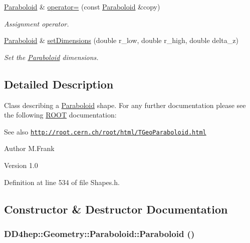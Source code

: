 \begin{DoxyCompactItemize}
\hyperlink{class_d_d4hep_1_1_geometry_1_1_paraboloid}{Paraboloid} \& \hyperlink{class_d_d4hep_1_1_geometry_1_1_paraboloid_ad6b240ee1db323b5a8f69c292632d011}{operator=} (const \hyperlink{class_d_d4hep_1_1_geometry_1_1_paraboloid}{Paraboloid} \&copy)
\begin{DoxyCompactList}\small\item\em Assignment operator. \item\end{DoxyCompactList}\item 
\hyperlink{class_d_d4hep_1_1_geometry_1_1_paraboloid}{Paraboloid} \& \hyperlink{class_d_d4hep_1_1_geometry_1_1_paraboloid_ac05a503afc384dfc0fc882465e9e43df}{setDimensions} (double r\_\-low, double r\_\-high, double delta\_\-z)
\begin{DoxyCompactList}\small\item\em Set the \hyperlink{class_d_d4hep_1_1_geometry_1_1_paraboloid}{Paraboloid} dimensions. \item\end{DoxyCompactList}\end{DoxyCompactItemize}


\subsection{Detailed Description}
Class describing a \hyperlink{class_d_d4hep_1_1_geometry_1_1_paraboloid}{Paraboloid} shape. For any further documentation please see the following \hyperlink{namespace_r_o_o_t}{ROOT} documentation: \begin{DoxySeeAlso}{See also}
\href{http://root.cern.ch/root/html/TGeoParaboloid.html}{\tt http://root.cern.ch/root/html/TGeoParaboloid.html}
\end{DoxySeeAlso}
\begin{DoxyAuthor}{Author}
M.Frank 
\end{DoxyAuthor}
\begin{DoxyVersion}{Version}
1.0 
\end{DoxyVersion}


Definition at line 534 of file Shapes.h.

\subsection{Constructor \& Destructor Documentation}
\hypertarget{class_d_d4hep_1_1_geometry_1_1_paraboloid_a8be57432e8083414ec8e3fbe1ba5fcbf}{
\subsubsection[{Paraboloid}]{\setlength{\rightskip}{0pt plus 5cm}DD4hep::Geometry::Paraboloid::Paraboloid ()}}
\label{class_d_d4hep_1_1_geometry_1_1_paraboloid_a8be57432e8083414ec8e3fbe1ba5fcbf}



